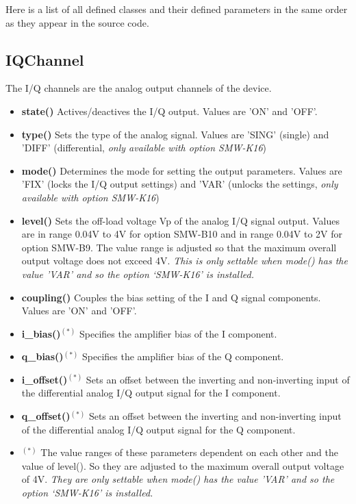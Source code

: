 \documentclass[11pt]{article} %
\begin{document}
Here is a list of all defined classes and their defined parameters in the same order as they appear in the source code.


\subsection{IQChannel}

The I/Q channels are the analog output channels of the device.
\begin{itemize}
\item {\bf state()} Actives/deactives the I/Q output. Values are 'ON' and 'OFF'.
\item {\bf type()} Sets the type of the analog signal. Values are 'SING' (single) and 'DIFF' (differential, {\it only available with option SMW-K16})
\item {\bf mode()} Determines the mode for setting the output parameters. Values are 'FIX' (locks the I/Q output settings) and 'VAR' (unlocks the settings, {\it only available with option SMW-K16})
\item {\bf level()} Sets the off-load voltage Vp of the analog I/Q signal output. Values are in range 0.04V to 4V for option SMW-B10 and in range 0.04V to 2V for option SMW-B9. The value range is adjusted so that the maximum overall output voltage does not exceed 4V. {\it This is only settable when mode() has the value 'VAR' and so the option `SMW-K16' is installed.}
\item {\bf coupling()} Couples the bias setting of the I and Q signal components. Values are 'ON' and 'OFF'.
\item {\bf i\_bias()}$^{(*)}$ Specifies the amplifier bias of the I component.
\item {\bf q\_bias()}$^{(*)}$ Specifies the amplifier bias of the Q component.
\item {\bf i\_offset()}$^{(*)}$ Sets an offset between the inverting and non-inverting input of the differential analog I/Q output signal for the I component.
\item {\bf q\_offset()}$^{(*)}$ Sets an offset between the inverting and non-inverting input of the differential analog I/Q output signal for the Q component.
\item[] $^{(*)}$ The value ranges of these parameters dependent on each other and the value of level(). So they are adjusted to the maximum overall output voltage of 4V. {\it They are only settable when mode() has the value 'VAR' and so the option `SMW-K16' is installed.}
\end{itemize}
\end{document}
